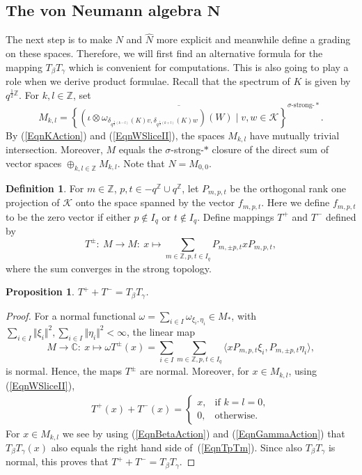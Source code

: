\documentclass[pdftex]{sigma}
\numberwithin{equation}{section}
\newtheorem{prop}[thm]{Proposition}
\theoremstyle{definition}
\newtheorem{dfn}[thm]{Definition}
\begin{document}
\subsection*{The von Neumann algebra $\boldsymbol{N}$}

The next step is to make $N$ and $\hat{N}$ more explicit and meanwhile def\/ine a grading on these spaces. Therefore, we will f\/irst f\/ind an alternative formula for the mapping $T_\beta T_\gamma$ which is  convenient for computations. This is also going to play a role when we   derive product formulae. Recall that the spectrum of $K$ is given by $q^{\frac{1}{2}\mathbb{Z}}$. For $k, l \in \mathbb{Z}$, set
\[
M_{k,l}   = \overline{\left\{
(\iota \otimes \omega_{\delta_{q^{\frac{1}{2}(k-l)}}(K) v, \delta_{q^{\frac{1}{2}(k+l)}}(K) w})(W) \mid v,w \in   \mathcal{K}
\right\} }^{\sigma\text{-strong-}\ast}.
\]
By (\ref{EqnKAction})   and (\ref{EqnWSliceII}), the spaces $M_{k,l}$ have mutually trivial intersection. Moreover, $M$ equals the $\sigma$-strong-$\ast$ closure of the direct sum of vector spaces $\oplus_{k,l \in \mathbb{Z}} M_{k,l}$. Note that $N = M_{0,0}$.

\begin{dfn}
For $m \in \mathbb{Z}$, $p, t \in -q^{\mathbb{Z}} \cup q^{\mathbb{Z}}$, let $P_{m,p,t}$ be the orthogonal rank one projection of $\mathcal{K}$ onto the space spanned by the vector $f_{m,p,t}$. Here we def\/ine $f_{m,p,t}$ to be the zero vector if either $p \not \in I_q$ or $t \not \in I_q$.  Def\/ine mappings $T^+$ and $T^-$ def\/ined by
\[
T^{\pm}: \ M \rightarrow M: \  x \mapsto \sum_{m \in \mathbb{Z}, p,t \in I_q} P_{m,\pm p,t} x P_{m,p,t},
\]
where the sum converges in the strong topology.
\end{dfn}
\begin{prop}\label{PropTpTm}
$T^+ + T^- = T_\beta T_\gamma$.
\end{prop}
\begin{proof}
 For a normal functional $\omega = \sum_{i \in I} \omega_{\xi_i, \eta_i} \in M_\ast$, with $\sum_{i \in I} \Vert \xi_i \Vert^2, \sum_{i \in I} \Vert \eta_i \Vert^2 < \infty$, the linear map
\[
M \rightarrow \mathbb{C}: \  x \mapsto \omega T^\pm(x) = \sum_{i \in I} \sum_{m \in \mathbb{Z}, p, t \in I_q} \langle x P_{m,p,t} \xi_i, P_{m,\pm p,t} \eta_i \rangle,
\]
is normal. Hence, the maps $T^\pm$ are normal. Moreover, for $x \in M_{k,l}$, using (\ref{EqnWSliceII}),
\begin{gather}\label{EqnTpTm}
T^+(x)  + T^-(x) = \left\{
\begin{array}{ll}
x, & \textrm{if } k=l=0, \\
0, & \textrm{otherwise}.
\end{array}
\right.
\end{gather}
For $x \in M_{k,l}$ we see by using (\ref{EqnBetaAction}) and (\ref{EqnGammaAction}) that $T_\beta T_\gamma (x)$ also equals the right hand side of~(\ref{EqnTpTm}).
Since also $T_\beta T_\gamma$ is normal, this proves that $T^+ + T^- = T_\beta T_\gamma$.
\end{proof}
\end{document}
